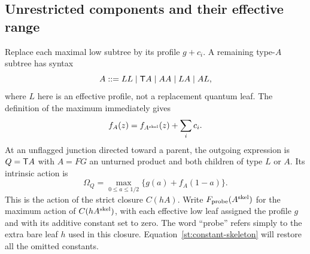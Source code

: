 \subsection{Unrestricted components and their effective range}
Replace each maximal low subtree by its profile
$g+c_i$. A remaining type-$A$ subtree has syntax
\begin{equation}\label{st:skeleton}
 A::=LL\mid\mathsf T A\mid AA\mid LA\mid AL,
\end{equation}
where $L$ here is an effective profile, not a
replacement quantum leaf. The definition of the
maximum immediately gives
\begin{equation}\label{st:constant-skeleton}
 f_A(z)=f_{A^{\rm skel}}(z)+\sum_i c_i.
\end{equation}
At an unflagged junction directed toward a parent,
the outgoing expression is $Q=\mathsf T A$ with $A=FG$
an unturned product and both children of type $L$
or $A$. Its intrinsic action is
\[
 \Omega_Q=\max_{0\le a\le1/2}
                 \{g(a)+f_A(1-a)\}.
\]
This is the action of the strict closure $C(hA)$.
Write $F_{\rm probe}(A^{\rm skel})$ for the maximum action of
$C(hA^{\rm skel})$, with each effective low leaf assigned the
profile $g$ and with its additive constant set to zero. The word
``probe'' refers simply to the extra bare leaf $h$ used in this
closure. Equation~\eqref{st:constant-skeleton} will restore all
the omitted constants.

